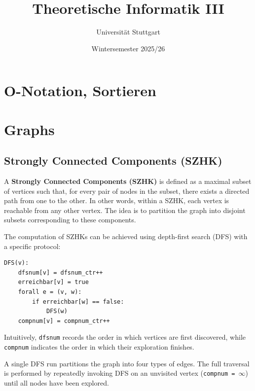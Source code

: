 \documentclass{article}
\begin{document}
\title{Theoretische Informatik III}
\date{Wintersemester 2025/26}
\author{Universität Stuttgart}
\maketitle
\tableofcontents

\newpage

\section{O-Notation, Sortieren}


\section{Graphs}

\subsection{Strongly Connected Components (SZHK)}

\noindent
A \textbf{Strongly Connected Components (SZHK)} is defined as a maximal subset of vertices such that, for every pair of nodes in the subset, there exists a directed path from one to the other.  
In other words, within a SZHK, each vertex is reachable from any other vertex.  
The idea is to partition the graph into disjoint subsets corresponding to these components.

\vspace{1em}
\noindent
The computation of SZHKs can be achieved using depth-first search (DFS) with a specific protocol:

\begin{verbatim}
DFS(v):
    dfsnum[v] = dfsnum_ctr++
    erreichbar[v] = true
    forall e = (v, w):
        if erreichbar[w] == false:
            DFS(w)
    compnum[v] = compnum_ctr++
\end{verbatim}

\noindent
Intuitively, \texttt{dfsnum} records the order in which vertices are first discovered, while \texttt{compnum} indicates the order in which their exploration finishes.

\vspace{1em}
\noindent
A single DFS run partitions the graph into four types of edges.  
The full traversal is performed by repeatedly invoking DFS on an unvisited vertex (\texttt{compnum = $\infty$}) until all nodes have been explored.
\end{document}
